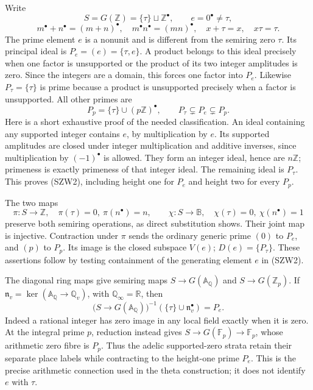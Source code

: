 \documentclass[
  10pt,
  a4paper,
]{article}
\begin{document}
Write \[
S=G(\mathbb Z)=\{\tau\}\sqcup\mathbb Z^\bullet,
\qquad e=0^\bullet\ne\tau,
\] \[
m^\bullet+n^\bullet=(m+n)^\bullet,\quad
m^\bullet n^\bullet=(mn)^\bullet,\quad
x+\tau=x,\quad x\tau=\tau.
\tag{SZW1}
\] The prime element \(e\) is a nonunit and is different from the
semiring zero \(\tau\). Its principal ideal is \(P_e=(e)=\{\tau,e\}\). A
product belongs to this ideal precisely when one factor is unsupported
or the product of its two integer amplitudes is zero. Since the integers
are a domain, this forces one factor into \(P_e\). Likewise
\(P_\tau=\{\tau\}\) is prime because a product is unsupported precisely
when a factor is unsupported. All other primes are \[
P_p=\{\tau\}\cup(p\mathbb Z)^\bullet,
\qquad
P_\tau\subsetneq P_e\subsetneq P_p.
\tag{SZW2}
\] Here is a short exhaustive proof of the needed classification. An
ideal containing any supported integer contains \(e\), by multiplication
by \(e\). Its supported amplitudes are closed under integer
multiplication and additive inverses, since multiplication by
\((-1)^\bullet\) is allowed. They form an integer ideal, hence are
\(n\mathbb Z\); primeness is exactly primeness of that integer ideal.
The remaining ideal is \(P_\tau\). This proves (SZW2), including height
one for \(P_e\) and height two for every \(P_p\).

The two maps \[
\pi:S\to\mathbb Z,\quad \pi(\tau)=0,\ \pi(n^\bullet)=n,
\qquad
\chi:S\to\mathbb B,\quad \chi(\tau)=0,\ \chi(n^\bullet)=1
\tag{SZW3}
\] preserve both semiring operations, as direct substitution shows.
Their joint map is injective. Contraction under \(\pi\) sends the
ordinary generic prime \((0)\) to \(P_e\), and \((p)\) to \(P_p\). Its
image is the closed subspace \(V(e)\); \(D(e)=\{P_\tau\}\). These
assertions follow by testing containment of the generating element \(e\)
in (SZW2).

The diagonal ring maps give semiring maps
\(S\to G(\mathbb A_{\mathbb Q})\) and \(S\to G(\mathbb Z_p)\). If
\(\mathfrak n_v=\ker(\mathbb A_{\mathbb Q}\to\mathbb Q_v)\), with
\(\mathbb Q_\infty=\mathbb R\), then \[
\bigl(S\to G(\mathbb A_{\mathbb Q})\bigr)^{-1}
(\{\tau\}\cup\mathfrak n_v^\bullet)=P_e.
\tag{SZW4}
\] Indeed a rational integer has zero image in any local field exactly
when it is zero. At the integral prime \(p\), reduction instead gives
\(S\to G(\mathbb F_p)\to\mathbb F_p\), whose arithmetic zero fibre is
\(P_p\). Thus the adelic supported-zero strata retain their separate
place labels while contracting to the height-one prime \(P_e\). This is
the precise arithmetic connection used in the theta construction; it
does not identify \(e\) with \(\tau\).
\end{document}
